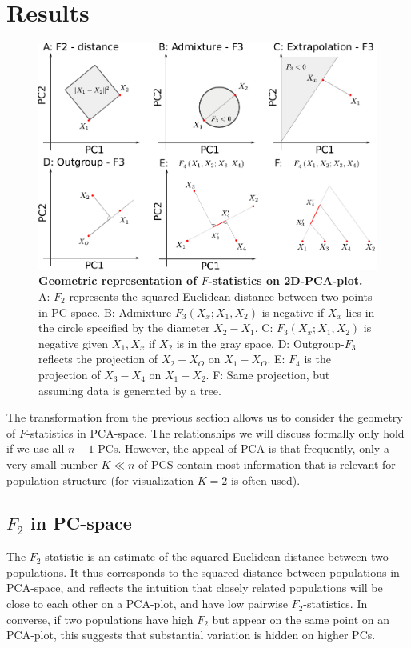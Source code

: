 \documentclass[12pt,fullpage, a4paper]{article}
\begin{document}
\section{Results}

\begin{figure}[!ht]
	\includegraphics[width=\textwidth]{figures/fstats_on_pca.pdf}
	\caption{\textbf{Geometric representation of $F$-statistics on 2D-PCA-plot.} A: $F_2$ represents the squared Euclidean distance between two points in PC-space. B: Admixture-$F_3(X_x; X_1, X_2)$ is negative if $X_x$ lies in the circle specified by the diameter $X_2-X_1$. C: $F_3(X_x; X_1, X_2)$ is negative given $X_1, X_x$ if $X_2$ is in the gray space.  D: Outgroup-$F_3$ reflects the projection of $X_2 - X_O$ on $X_1 - X_O$. E: $F_4$ is the projection of $X_3 - X_4$ on $X_1-X_2$. F: Same projection, but assuming data is generated by a tree.}
	\label{fig:geom}
\end{figure}

The transformation from the previous section allows us to consider the geometry
of $F$-statistics in PCA-space. The relationships we will discuss formally only
hold if we use all $n-1$ PCs. However, the appeal of PCA is that frequently,
only a very small number $K \ll n$ of PCS contain most information that is
relevant for population structure (for visualization
$K=2$ is often used).

\subsection{$F_2$ in PC-space}
The $F_2$-statistic is an estimate of the squared Euclidean distance between two
populations. It thus corresponds to the squared distance between populations in PCA-space, and
reflects the intuition that closely related populations  will be close to each other on a
PCA-plot, and have low pairwise $F_2$-statistics. In converse, if two
populations have high $F_2$ but appear on the same point on an PCA-plot, this suggests
that substantial variation is hidden on higher PCs.
\end{document}
